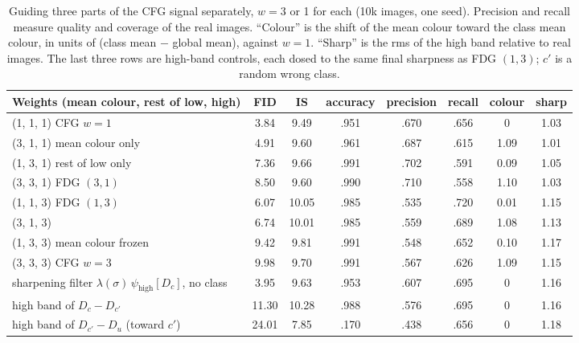 \documentclass[11pt]{article}
\newcommand{\high}{\psi_{\mathrm{high}}}
\begin{document}
\begin{table}[t]
  \centering
  \small
  \caption{Guiding three parts of the CFG signal separately, $w = 3$ or 1 for each (10k images, one seed). Precision
  and recall \cite{prc} measure quality and coverage of the real images. ``Colour'' is the shift of the mean colour
  toward the class mean colour, in units of (class mean $-$ global mean), against $w = 1$. ``Sharp'' is the rms of
  the high band relative to real images. The last three rows are high-band controls, each dosed to the same final
  sharpness as FDG $(1,3)$; $c'$ is a random wrong class.}
  \label{tab:dials}
  \begin{tabular}{lccccccc}
    \toprule
    Weights (mean colour, rest of low, high) & FID & IS & accuracy & precision & recall & colour & sharp \\
    \midrule
    (1, 1, 1) \; CFG $w=1$          & 3.84 & 9.49 & .951 & .670 & .656 & 0    & 1.03 \\
    (3, 1, 1) \; mean colour only   & 4.91 & 9.60 & .961 & .687 & .615 & 1.09 & 1.01 \\
    (1, 3, 1) \; rest of low only   & 7.36 & 9.66 & .991 & .702 & .591 & 0.09 & 1.05 \\
    (3, 3, 1) \; FDG $(3,1)$        & 8.50 & 9.60 & .990 & .710 & .558 & 1.10 & 1.03 \\
    (1, 1, 3) \; FDG $(1,3)$        & 6.07 & 10.05 & .985 & .535 & .720 & 0.01 & 1.15 \\
    (3, 1, 3)                       & 6.74 & 10.01 & .985 & .559 & .689 & 1.08 & 1.13 \\
    (1, 3, 3) \; mean colour frozen & 9.42 & 9.81 & .991 & .548 & .652 & 0.10 & 1.17 \\
    (3, 3, 3) \; CFG $w=3$          & 9.98 & 9.70 & .991 & .567 & .626 & 1.09 & 1.15 \\
    \midrule
    sharpening filter $\lambda(\sigma)\,\high[D_c]$, no class & 3.95 & 9.63 & .953 & .607 & .695 & 0 & 1.16 \\
    high band of $D_c - D_{c'}$                              & 11.30 & 10.28 & .988 & .576 & .695 & 0 & 1.16 \\
    high band of $D_{c'} - D_u$ (toward $c'$)                & 24.01 & 7.85 & .170 & .438 & .656 & 0 & 1.18 \\
    \bottomrule
  \end{tabular}
\end{table}
\end{document}
